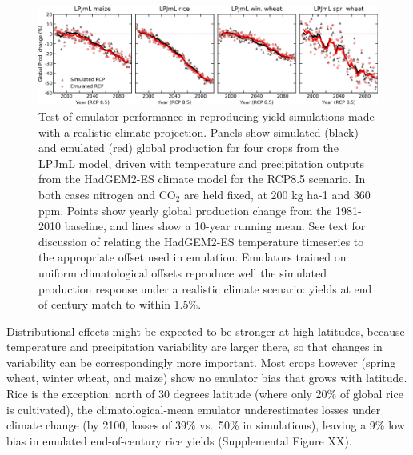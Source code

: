 \documentclass[gmd, manuscript]{copernicus} %
\begin{document}
\begin{figure}[ht]
  \centering
  \includegraphics[width = 16.3cm]{figures/LPJMLRCP85comp.png}
  \caption{
  Test of emulator performance in reproducing yield simulations made with a realistic climate projection. 
  Panels show simulated (black) and emulated (red) global production for four crops from the LPJmL model, driven with temperature and precipitation outputs from the HadGEM2-ES climate model for the RCP8.5 scenario. 
  In both cases nitrogen and CO$_2$ are held fixed, at 200 kg ha-1 and 360 ppm.
  Points show yearly global production change from the 1981-2010 baseline, and lines show a 10-year running mean. 
  See text for discussion of relating the HadGEM2-ES temperature timeseries to the appropriate offset used in emulation. %
  Emulators trained on uniform climatological offsets reproduce well the simulated production response under a realistic climate scenario: yields at end of century match to within 1.5\%. 
  }
  \label{fig:lpjmlrcp}
\end{figure}

Distributional effects might be expected to be stronger at high latitudes, because temperature and precipitation variability are larger there, so that changes in variability can be correspondingly more important. 
Most crops however (spring wheat, winter wheat, and maize) show no emulator bias that grows with latitude.
Rice is the exception: north of 30 degrees latitude (where only 20\% of global rice is cultivated), the climatological-mean emulator underestimates losses under climate change (by 2100, losses of 39\% vs.\ 50\% in simulations), leaving a 9\% low bias in emulated end-of-century rice yields (Supplemental Figure XX). 

\end{document}
